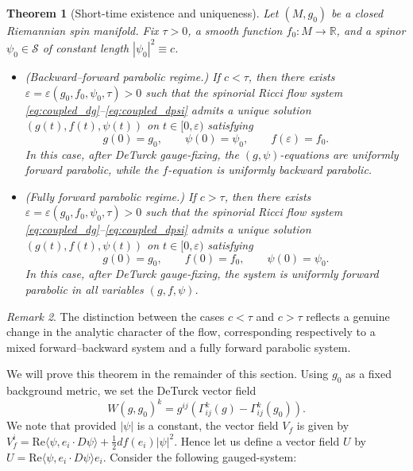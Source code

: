 \documentclass{amsart}
\newtheorem{theorem}{Theorem}[section]
\theoremstyle{definition}
\theoremstyle{remark}
\newtheorem{remark}[theorem]{Remark}
\numberwithin{equation}{section}
\begin{document}
\begin{theorem}[Short-time existence and uniqueness]\label{thm;short-time-existence}
Let $(M,g_0)$ be a closed Riemannian spin manifold. Fix $\tau>0$, a smooth function
$f_0\colon M\to\mathbb{R}$, and a spinor $\psi_0\in\mathcal{S}$ of constant length
$|\psi_0|^2\equiv c$.
\begin{itemize}
\item[(i)] \emph{(Backward--forward parabolic regime.)}
If $c<\tau$, then there exists $\varepsilon=\varepsilon(g_0,f_0,\psi_0,\tau)>0$
such that the spinorial Ricci flow system \eqref{eq:coupled_dg}--\eqref{eq:coupled_dpsi}
admits a unique solution $(g(t),f(t),\psi(t))$ on $t\in[0,\varepsilon)$ satisfying
\[
g(0)=g_0,\qquad \psi(0)=\psi_0,\qquad f(\varepsilon)=f_0.
\]
In this case, after DeTurck gauge-fixing, the $(g,\psi)$-equations are uniformly
forward parabolic, while the $f$-equation is uniformly \emph{backward} parabolic.

\item[(ii)] \emph{(Fully forward parabolic regime.)}
If $c>\tau$, then there exists $\varepsilon=\varepsilon(g_0,f_0,\psi_0,\tau)>0$
such that the spinorial Ricci flow system \eqref{eq:coupled_dg}--\eqref{eq:coupled_dpsi}
admits a unique solution $(g(t),f(t),\psi(t))$ on $t\in[0,\varepsilon)$ satisfying
\[
g(0)=g_0,\qquad f(0)=f_0,\qquad \psi(0)=\psi_0.
\]
In this case, after DeTurck gauge-fixing, the system is uniformly \emph{forward
parabolic} in all variables $(g,f,\psi)$.
\end{itemize}
\end{theorem}

\begin{remark}
The distinction between the cases $c<\tau$ and $c>\tau$ reflects a genuine change
in the analytic character of the flow, corresponding respectively to a mixed
forward--backward system and a fully forward parabolic system.
\end{remark}

We will prove this theorem in the remainder of this section. 
Using $g_0$ as a fixed  background metric, we set the DeTurck vector field
	\[	W(g,g_0)^k = g^{ij}(\Gamma_{ij}^k(g) - \Gamma_{ij}^k(g_0)).\]
We note that provided $|\psi|$ is a constant, the vector field $V_f$ is given by $V_f^i = \text{Re}\langle\psi, e_i\cdot D\psi\rangle + \frac{1}{2}df(e_i)|\psi|^2$. Hence let us define a vector field $U$ by $U = \text{Re}\langle\psi, e_i\cdot D\psi\rangle e_i$.   Consider the following gauged-system:
\end{document}
